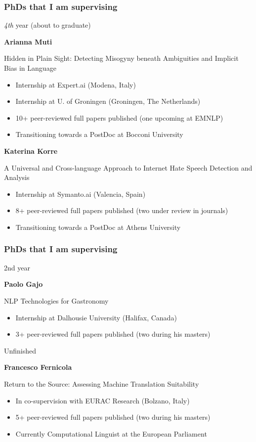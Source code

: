 \documentclass[xcolor=x11names]{beamer}
\begin{document}
\begin{frame}
\frametitle{PhDs that I am supervising}

\alert{\textit{4th} year (about to graduate)}

\textbf{Arianna Muti} 

Hidden in Plain Sight: Detecting Misogyny beneath Ambiguities and Implicit Bias 
in Language				\pause 

\begin{itemize}
 \item Internship at Expert.ai (Modena, Italy)
 \item Internship at U. of Groningen (Groningen, The Netherlands)
 \item 10+ peer-reviewed full papers published (one upcoming at EMNLP)
 \item Transitioning towards a PostDoc at Bocconi University
\end{itemize}					\pause 


\textbf{Katerina Korre}

A Universal and Cross-language Approach to Internet Hate Speech Detection and
Analysis			\pause 

\begin{itemize}
 \item Internship at Symanto.ai (Valencia, Spain)
 \item 8+ peer-reviewed full papers published (two under review in journals)
 \item Transitioning towards a PostDoc at Athens University
\end{itemize}
\end{frame}

\begin{frame}
\frametitle{PhDs that I am supervising}

\alert{2nd year}

\textbf{Paolo Gajo}

NLP Technologies for Gastronomy			\pause

\begin{itemize}
 \item Internship at Dalhousie University (Halifax, Canada)
 \item 3+ peer-reviewed full papers published (two during his masters)
\end{itemize}						\pause 
\bigskip

\alert{Unfinished}

\textbf{Francesco Fernicola}

Return to the Source: Assessing Machine Translation Suitability	\pause 


\begin{itemize}
 \item In co-supervision with EURAC Research (Bolzano, Italy)
 \item 5+ peer-reviewed full papers published (two during his masters)
 \item Currently Computational Linguist at the European Parliament
\end{itemize}


\end{frame}
\end{document}
